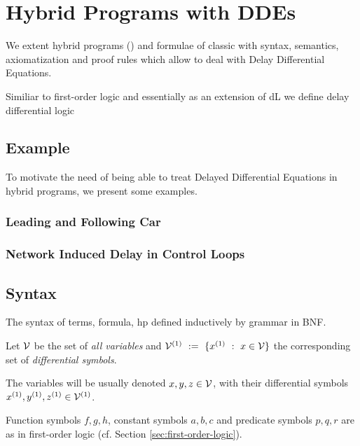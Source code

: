 \chapter{Hybrid Programs with DDEs}\label{hybrid-programs-with-ddes}

We extent hybrid programs (\HPs) and formulae of classic \dL with syntax, semantics, axiomatization and proof rules which allow to deal with Delay Differential Equations.

Similiar to first-order logic and essentially as an extension of dL we define delay differential logic

\cite{Platzer12Complete,Platzer15Uniform}

\section{Example}
    \label{example-hp-cars}
    To motivate the need of being able to treat Delayed Differential Equations in hybrid programs, we present some examples.

    \subsection{Leading and Following Car}

    \subsection{Network Induced Delay in Control Loops}

\section{Syntax}
    \label{sec:syntax}

    The syntax of terms, formula, hp defined inductively by grammar in BNF.

    Let $\mathcal{V}$ be the set of \emph{all variables} and $\diffvars\defeq\{\D{x} \with x\in\allvars\}$ the corresponding set of \emph{differential symbols}.

    The variables will be usually denoted $x,y,z\in\mathcal{V}$, with their differential symbols $\D{x},\D{y},\D{z}\in\diffvars$.

    Function symbols $f,g,h$, constant symbols $a,b,c$ and predicate symbols $p,q,r$ are as in first-order logic (cf. Section \ref{sec:first-order-logic}).

